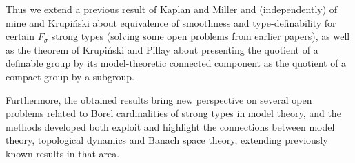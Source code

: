 \documentclass[12pt,a4paper]{article}
\begin{document}
	Thus we extend a previous result of Kaplan and Miller and (independently) of mine and Krupiński about equivalence of smoothness and type-definability for certain $F_\sigma$ strong types (solving some open problems from earlier papers), as well as the theorem of Krupiński and Pillay about presenting the quotient of a definable group by its model-theoretic connected component as the quotient of a compact group by a subgroup.
	
	Furthermore, the obtained results bring new perspective on several open problems related to Borel cardinalities of strong types in model theory, and the methods developed both exploit and highlight the connections between model theory, topological dynamics and Banach space theory, extending previously known results in that area.
\end{document}
